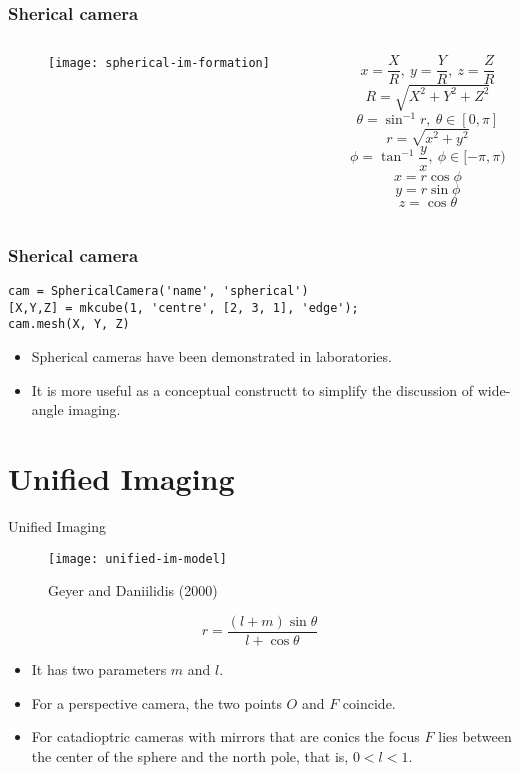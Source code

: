 \begin{frame}
\frametitle{Sherical camera}
\begin{columns}
\begin{column}{.5\textwidth}
\begin{figure}[!h]
\centering
\texttt{[image: spherical-im-formation]}
\end{figure}
\end{column}
\begin{column}{.5\textwidth}
\[
x=\dfrac{X}{R},\ y=\dfrac{Y}{R},\ z=\dfrac{Z}{R}
\]
\[
R = \sqrt{X^2 + Y^2 + Z^2}
\]
\[
\theta = \sin ^{-1} r,\ \theta \in  [0,\pi]
\]
\[
r = \sqrt{x^2 + y^2}
\]
\[
\phi = \tan ^{-1} \dfrac{y}{x},\ \phi \in [-\pi, \pi)
\]
\[
x = r\cos \phi
\]
\[
y = r\sin \phi
\]
\[
z = \cos \theta
\]
\end{column}
\end{columns}
\end{frame}

\begin{frame}[fragile]
\frametitle{Sherical camera}
\begin{lstlisting}
cam = SphericalCamera('name', 'spherical')
[X,Y,Z] = mkcube(1, 'centre', [2, 3, 1], 'edge');
cam.mesh(X, Y, Z)
\end{lstlisting}
\end{frame}

\begin{frame}
\begin{itemize}
\item Spherical cameras have been demonstrated in laboratories.
\item It is more useful as a conceptual constructt to simplify the discussion of wide-angle imaging.
\end{itemize}
\end{frame}

\section{Unified Imaging}

\begin{frame}
Unified Imaging
\begin{figure}[!h]
\centering
\texttt{[image: unified-im-model]}
\caption{Geyer and Daniilidis (2000)}
\end{figure}
\end{frame}

\begin{frame}
\[
r = \dfrac{(l+m)\sin \theta}{l + \cos \theta}
\]
\begin{itemize}
\item It has two parameters $m$ and $l$.
\item For a perspective camera, the two points $O$ and $F$ coincide.
\item For catadioptric cameras with mirrors that are conics the focus $F$ lies between the center
of the sphere and the north pole, that is, $0 < l < 1$.
\end{itemize}
\end{frame}

